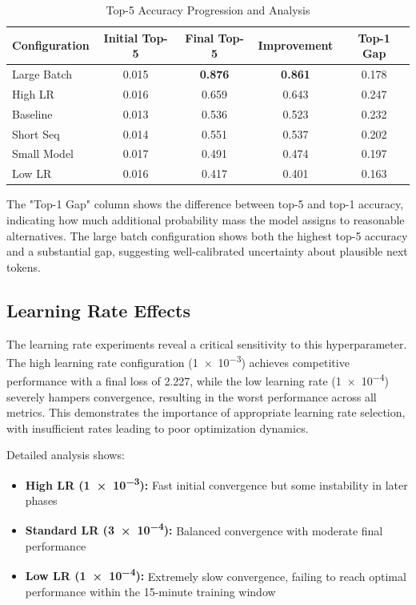 \documentclass[11pt,a4paper]{article}
\begin{document}
\begin{table}[H]
\centering
\caption{Top-5 Accuracy Progression and Analysis}
\label{tab:top5}
\begin{tabular}{@{}lcccc@{}}
\toprule
Configuration & Initial Top-5 & Final Top-5 & Improvement & Top-1 Gap \\
\midrule
Large Batch & 0.015 & \textbf{0.876} & \textbf{0.861} & 0.178 \\
High LR & 0.016 & 0.659 & 0.643 & 0.247 \\
Baseline & 0.013 & 0.536 & 0.523 & 0.232 \\
Short Seq & 0.014 & 0.551 & 0.537 & 0.202 \\
Small Model & 0.017 & 0.491 & 0.474 & 0.197 \\
Low LR & 0.016 & 0.417 & 0.401 & 0.163 \\
\bottomrule
\end{tabular}
\end{table}

The "Top-1 Gap" column shows the difference between top-5 and top-1 accuracy, indicating how much additional probability mass the model assigns to reasonable alternatives. The large batch configuration shows both the highest top-5 accuracy and a substantial gap, suggesting well-calibrated uncertainty about plausible next tokens.

\subsection{Learning Rate Effects}
The learning rate experiments reveal a critical sensitivity to this hyperparameter. The high learning rate configuration (\num{1e-3}) achieves competitive performance with a final loss of 2.227, while the low learning rate (\num{1e-4}) severely hampers convergence, resulting in the worst performance across all metrics. This demonstrates the importance of appropriate learning rate selection, with insufficient rates leading to poor optimization dynamics.

Detailed analysis shows:
\begin{itemize}
    \item \textbf{High LR (\num{1e-3}):} Fast initial convergence but some instability in later phases
    \item \textbf{Standard LR (\num{3e-4}):} Balanced convergence with moderate final performance
    \item \textbf{Low LR (\num{1e-4}):} Extremely slow convergence, failing to reach optimal performance within the 15-minute training window
\end{itemize}
\end{document}
